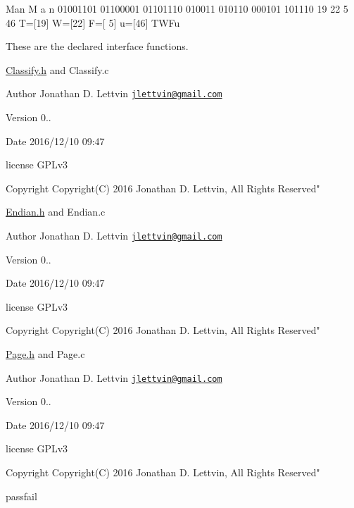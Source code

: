 Man M a n 01001101 01100001 01101110 010011 010110 000101 101110 19 22 5 46 T=\mbox{[}19\mbox{]} W=\mbox{[}22\mbox{]} F=\mbox{[} 5\mbox{]} u=\mbox{[}46\mbox{]} T\+W\+Fu

These are the declared interface functions.

\hyperlink{_classify_8h_source}{Classify.\+h} and Classify.\+c

\begin{DoxyAuthor}{Author}
Jonathan D. Lettvin \href{mailto:jlettvin@gmail.com}{\tt jlettvin@gmail.\+com}
\end{DoxyAuthor}
\begin{DoxyVersion}{Version}
0..
\end{DoxyVersion}
\begin{DoxyDate}{Date}
2016/12/10 09\+:47
\end{DoxyDate}
license G\+P\+Lv3

\begin{DoxyCopyright}{Copyright}
Copyright(\+C) 2016 Jonathan D. Lettvin, All Rights Reserved"
\end{DoxyCopyright}
\hyperlink{_endian_8h_source}{Endian.\+h} and Endian.\+c

\begin{DoxyAuthor}{Author}
Jonathan D. Lettvin \href{mailto:jlettvin@gmail.com}{\tt jlettvin@gmail.\+com}
\end{DoxyAuthor}
\begin{DoxyVersion}{Version}
0..
\end{DoxyVersion}
\begin{DoxyDate}{Date}
2016/12/10 09\+:47
\end{DoxyDate}
license G\+P\+Lv3

\begin{DoxyCopyright}{Copyright}
Copyright(\+C) 2016 Jonathan D. Lettvin, All Rights Reserved"
\end{DoxyCopyright}
\hyperlink{_page_8h_source}{Page.\+h} and Page.\+c

\begin{DoxyAuthor}{Author}
Jonathan D. Lettvin \href{mailto:jlettvin@gmail.com}{\tt jlettvin@gmail.\+com}
\end{DoxyAuthor}
\begin{DoxyVersion}{Version}
0..
\end{DoxyVersion}
\begin{DoxyDate}{Date}
2016/12/10 09\+:47
\end{DoxyDate}
license G\+P\+Lv3

\begin{DoxyCopyright}{Copyright}
Copyright(\+C) 2016 Jonathan D. Lettvin, All Rights Reserved"
\end{DoxyCopyright}
passfail

